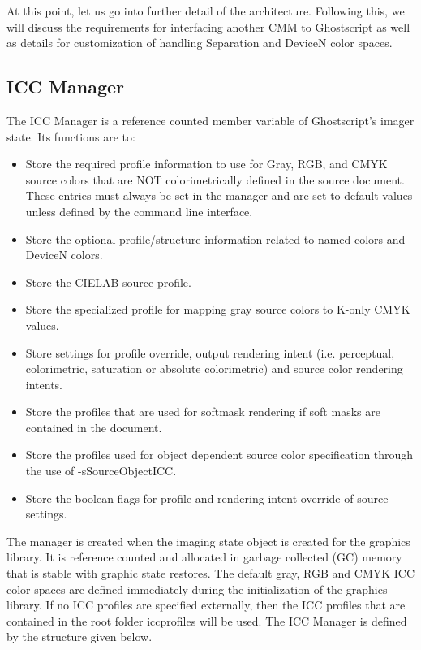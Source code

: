 \documentclass[12pt,notitlepage]{article}
\begin{document}
At this point, let us go into further detail of the architecture.  Following this, we will discuss the requirements for interfacing another CMM to Ghostscript as well as details for customization of handling Separation and DeviceN color spaces.

\subsection{ICC Manager}

The ICC Manager is a reference counted member variable of Ghostscript's imager state.  Its functions are to:

\begin{itemize}
\item Store the required profile information to use for Gray, RGB, and CMYK source colors that are NOT colorimetrically defined in the source document.  These entries must always be set in the manager and are set to default values unless defined by the command line interface.
\item Store the optional profile/structure information related to named colors and DeviceN colors.
\item Store the CIELAB source profile.
\item Store the specialized profile for mapping gray source colors to K-only CMYK values.
\item Store settings for profile override, output rendering intent (i.e. perceptual, colorimetric, saturation or absolute colorimetric) and source color rendering intents.
\item Store the profiles that are used for softmask rendering if soft masks are contained in the document.
\item Store the profiles used for object dependent source color specification through the use of -sSourceObjectICC.
\item Store the boolean flags for profile and rendering intent override of source settings.
\end{itemize}
The manager is created when the imaging state object is created for the graphics library.  It is reference counted and allocated in garbage collected (GC) memory that is stable with graphic state restores.  The default gray, RGB and CMYK ICC color spaces are defined immediately during the initialization of the graphics library.  If no ICC profiles are specified externally, then the ICC profiles that are contained in the root folder iccprofiles will be used.  The ICC Manager is defined by the structure given below.\\
\end{document}
